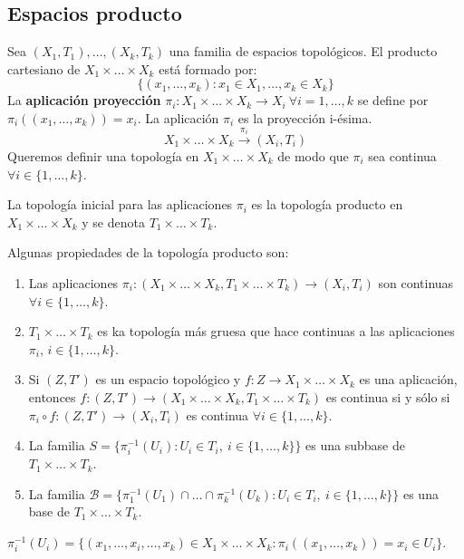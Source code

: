 \subsection{Espacios producto}
Sea $(X_1,T_1), \dots, (X_k, T_k)$ una familia de espacios topológicos. El producto cartesiano de $X_1 \times \dots \times X_k$ está formado por:
\[\{(x_1, \dots, x_k) : x_1 \in X_1, \dots, x_k \in X_k\}\]
La \textbf{aplicación proyección} $\pi_i:X_1 \times \dots \times X_k \to X_i \ \forall i = 1, \dots, k$ se define por $\pi_i((x_1, \dots, x_k)) = x_i$. La aplicación $\pi_i$ es la proyección i-ésima.
\[X_1 \times \dots \times X_k \stackrel{\pi_i}{\to}(X_i, T_i)\]
Queremos definir una topología en $X_1 \times \dots \times X_k$ de modo que $\pi_i$ sea continua $\forall i \in \{1,\dots,k\}$.
\begin{ndef}
  La topología inicial para las aplicaciones $\pi_i$ es la topología producto en $X_1 \times \dots \times X_k$ y se denota $T_1 \times \dots \times T_k$.
\end{ndef}
\begin{properties}
Algunas propiedades de la topología producto son:
\begin{enumerate}
    \item Las aplicaciones $\pi_i : (X_1 \times \dots \times X_k, T_1 \times \dots \times T_k) \to (X_i, T_i)$ son continuas $\forall i \in \{1,\dots,k\}$.
    \item $T_1 \times \dots \times T_k$ es ka topología más gruesa que hace continuas a las aplicaciones $\pi_i$, $i \in \{1,\dots,k\}$.
    \item Si $(Z,T')$ es un espacio topológico y $f: Z \to X_1 \times \dots \times X_k$ es una aplicación, entonces $f:(Z,T') \to (X_1 \times \dots \times X_k, T_1 \times \dots \times T_k)$ es continua si y sólo si $\pi_i \circ f: (Z,T') \to (X_i,T_i)$ es continua $\forall i \in \{1,\dots,k\}$.
    \item La familia $S = \{\pi^{-1}_i(U_i) : U_i \in T_i,\ i \in \{1,\dots,k\}\}$ es una subbase de $T_1 \times \dots \times T_k$.
    \item La familia $\mathcal{B} = \{\pi^{-1}_1(U_1) \cap \dots \cap \pi^{-1}_k(U_k) : U_i \in T_i,\ i \in \{1,\dots,k\}\}$ es una base de $T_1 \times \dots \times T_k$.
\end{enumerate}
\end{properties}
\begin{note}
    $\pi^{-1}_i(U_i) = \{(x_1, \dots, x_i, \dots, x_k) \in X_1 \times \dots \times X_k : \pi_i((x_1, \dots, x_k)) = x_i \in U_i\}$.
\end{note}

